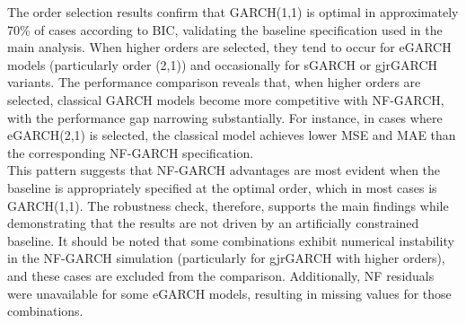 \documentclass[oneside,12pt]{CUEDthesisPSnPDF}
\begin{document}
The order selection results confirm that GARCH(1,1) is optimal in approximately 70\% of cases according to BIC, validating the baseline specification used in the main analysis. When higher orders are selected, they tend to occur for eGARCH models (particularly order (2,1)) and occasionally for sGARCH or gjrGARCH variants. The performance comparison reveals that, when higher orders are selected, classical GARCH models become more competitive with NF-GARCH, with the performance gap narrowing substantially. For instance, in cases where eGARCH(2,1) is selected, the classical model achieves lower MSE and MAE than the corresponding NF-GARCH specification.\\

This pattern suggests that NF-GARCH advantages are most evident when the baseline is appropriately specified at the optimal order, which in most cases is GARCH(1,1). The robustness check, therefore, supports the main findings while demonstrating that the results are not driven by an artificially constrained baseline. It should be noted that some combinations exhibit numerical instability in the NF-GARCH simulation (particularly for gjrGARCH with higher orders), and these cases are excluded from the comparison. Additionally, NF residuals were unavailable for some eGARCH models, resulting in missing values for those combinations.\\
\end{document}
